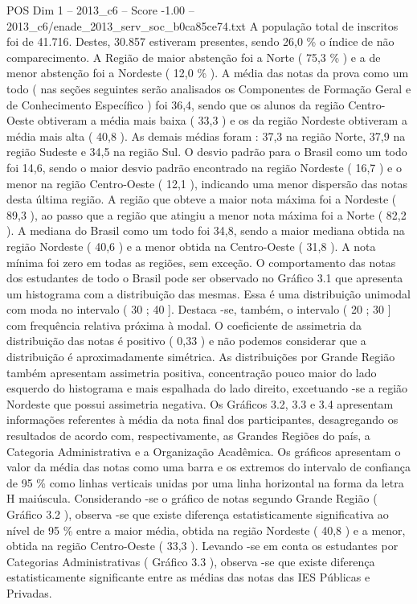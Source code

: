 \begin{textsample}{POS Dim 1 – 2013\_c6 – Score -1.00 – 2013\_c6/enade\_2013\_serv\_soc\_b0ca85ce74.txt}
A população total de inscritos foi de 41.716.
Destes, 30.857 estiveram presentes, sendo 26,0 \% o índice de não comparecimento.
A Região de maior abstenção foi a Norte ( 75,3 \% ) e a de menor abstenção foi a Nordeste ( 12,0 \% ).
A média das notas da prova como um todo ( nas seções seguintes serão analisados os Componentes de Formação Geral e de Conhecimento Específico ) foi 36,4, sendo que os alunos da região Centro-Oeste obtiveram a média mais baixa ( 33,3 ) e os da região Nordeste obtiveram a média mais alta ( 40,8 ).
As demais médias foram : 37,3 na região Norte, 37,9 na região Sudeste e 34,5 na região Sul.
O desvio padrão para o Brasil como um todo foi 14,6, sendo o maior desvio padrão encontrado na região Nordeste ( 16,7 ) e o menor na região Centro-Oeste ( 12,1 ), indicando uma menor dispersão das notas desta última região.
A região que obteve a maior nota máxima foi a Nordeste ( 89,3 ), ao passo que a região que atingiu a menor nota máxima foi a Norte ( 82,2 ).
A mediana do Brasil como um todo foi 34,8, sendo a maior mediana obtida na região Nordeste ( 40,6 ) e a menor obtida na Centro-Oeste ( 31,8 ).
A nota mínima foi zero em todas as regiões, sem exceção.
O comportamento das notas dos estudantes de todo o Brasil pode ser observado no Gráfico 3.1 que apresenta um histograma com a distribuição das mesmas.
Essa é uma distribuição unimodal com moda no intervalo ( 30 ; 40 ].
Destaca -se, também, o intervalo ( 20 ; 30 ] com frequência relativa próxima à modal.
O coeficiente de assimetria da distribuição das notas é positivo ( 0,33 ) e não podemos considerar que a distribuição é aproximadamente simétrica.
As distribuições por Grande Região também apresentam assimetria positiva, concentração pouco maior do lado esquerdo do histograma e mais espalhada do lado direito, excetuando -se a região Nordeste que possui assimetria negativa.
Os Gráficos 3.2, 3.3 e 3.4 apresentam informações referentes à média da nota final dos participantes, desagregando os resultados de acordo com, respectivamente, as Grandes Regiões do país, a Categoria Administrativa e a Organização Acadêmica.
Os gráficos apresentam o valor da média das notas como uma barra e os extremos do intervalo de confiança de 95 \% como linhas verticais unidas por uma linha horizontal na forma da letra H maiúscula.
Considerando -se o gráfico de notas segundo Grande Região ( Gráfico 3.2 ), observa -se que existe diferença estatisticamente significativa ao nível de 95 \% entre a maior média, obtida na região Nordeste ( 40,8 ) e a menor, obtida na região Centro-Oeste ( 33,3 ).
Levando -se em conta os estudantes por Categorias Administrativas ( Gráfico 3.3 ), observa -se que existe diferença estatisticamente significante entre as médias das notas das IES Públicas e Privadas.

\end{textsample}
